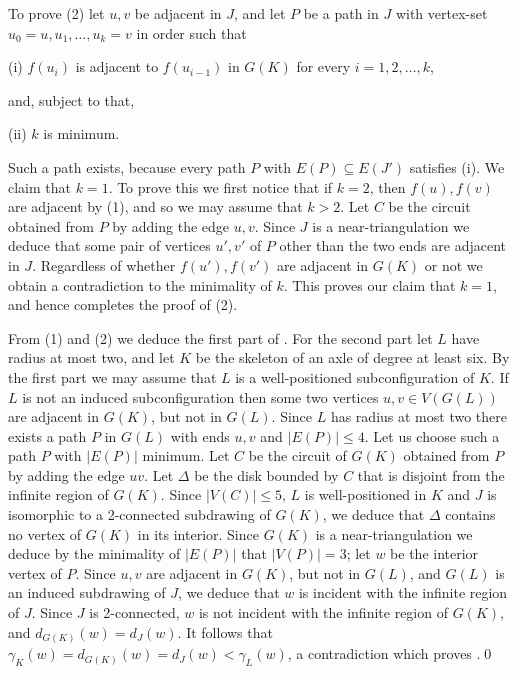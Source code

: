 To prove (2) let $u,v$ be adjacent in $J$, and let $P$ be a path in $J$ 
with 
vertex-set $u_0=u,u_1,\dots, u_k=v$ in order such that 
\item{(i)} $f(u_i)$ is adjacent to $f(u_{i-1})$ in $G(K)$ for every $i=1,2,\dots, 
k$,

\noindent and, subject to that,
\item{(ii)} $k$ is minimum.

\noindent Such a path exists, because every path $P$ with $E(P)\subseteq 
E(J')$ satisfies (i).
We claim that $k=1$.
To prove this we first notice that if $k=2$, then $f(u), f(v)$ are adjacent 
by (1), and so we
may assume that $k>2$.  Let $C$ be the circuit obtained from $P$ by adding 
the edge $u,v$.
Since $J$ is a near-triangulation we deduce that some pair of vertices 
$u',v'$ of $P$ other
than the two ends are adjacent in $J$.  Regardless of whether
$f(u'),f(v')$  are adjacent
in $G(K)$ or not we obtain a contradiction to the minimality of $k$.  
This proves our claim that
$k=1$, and hence completes the proof of (2).

  From (1) and (2) we deduce the first part of \stwo.  For the second
part  let $L$ have
radius at most two, and let $K$ be the skeleton of an axle of degree at 
least six.  By the first
part we may assume that $L$ is a well-positioned subconfiguration of $K$. 
If $L$ is not
an induced subconfiguration then some two vertices $u,v\in V(G(L))$
are  adjacent in
$G(K)$, but not in $G(L)$.  Since $L$ has radius at most two there exists 
a path $P$
in $G(L)$ with ends $u,v$ and $|E(P)|\le 4$.  Let us choose such a path 
$P$ with
$|E(P)|$ minimum.  Let $C$ be the circuit of $G(K)$ obtained from $P$ 
by adding
the edge $uv$.  Let $\Delta$ be the disk bounded by $C$ that is disjoint 
from the infinite
region of $G(K)$.  Since $|V(C)|\le 5$, $L$ is well-positioned in $K$ 
and $J$ is isomorphic
to a 2-connected subdrawing of $G(K)$, we deduce that $\Delta$ contains 
no vertex of $G(K)$
in its interior.  Since $G(K)$ is a near-triangulation we deduce by the 
minimality of $|E(P)|$
that $|V(P)|=3$; let $w$ be the interior vertex of $P$.  Since $u,v$
are  adjacent in $G(K)$, but not in $G(L)$, and $G(L)$ is an induced
subdrawing of $J$, 
 we deduce that $w$ is incident with the infinite region 
of $J$.
Since $J$ is 2-connected, $w$ is not incident with the infinite region
of $G(K)$, and $d_{G(K)}(w)=d_J(w)$.
 It follows that $\gamma_K(w)=d_{G(K)}(w)=d_J(w)<\gamma_L(w)$,
a contradiction which proves \stwo.\qed

